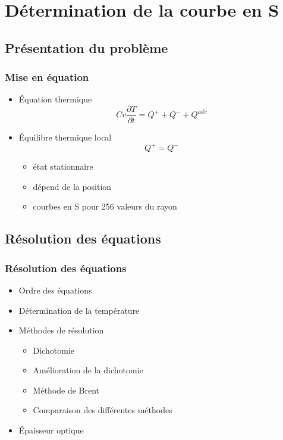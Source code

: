 \section{Détermination de la courbe en S}
\subsection*{Présentation du problème}
\begin{frame}
\frametitle{Mise en équation}

   \begin{itemize}
      \item Équation thermique
      \begin{equation}
         Cv\frac{\partial T}{\partial t} = Q^+ + Q^- +Q^{adv}
      \end{equation}
      
   \item Équilibre thermique local
   \begin{equation}
      Q^+ = Q^- 
   \end{equation}
   
      \begin{itemize}
         \item état stationnaire
         \\
         \item dépend de la position
         \item courbes en S pour 256 valeurs du rayon
      \end{itemize}
\end{itemize}
\end{frame}

\subsection*{Résolution des équations}
\begin{frame}
\frametitle{Résolution des équations}

   \begin{itemize}
      \item Ordre des équations
      \item Détermination de la température
      \item Méthodes de résolution
         \begin{itemize} 
            \item Dichotomie
            \item Amélioration de la dichotomie
            \item Méthode de Brent
            \item Comparaison des différentes méthodes
         \end{itemize}
      \item Épaisseur optique
   \end{itemize}
\end{frame}

